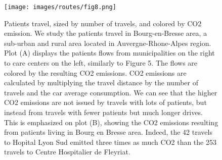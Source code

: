 \begin{figure}[t]
    \texttt{[image: images/routes/fig8.png]}
    \centering
    \caption{
        Patients travel, sized by number of travels, and colored by CO2 emission. We study the patients travel in Bourg-en-Bresse area, a sub-urban and rural area located in Auvergne-Rhone-Alpes region. Plot (A) displays the patients flows from municipalities on the right to care centers on the left, similarly to Figure 5. The flows are colored by the resulting CO2 emissions. CO2 emissions are calculated by multiplying the travel distance by the number of travels and the car average consumption. We can see that the higher CO2 emissions are not issued by travels with lots of patients, but instead from travels with fewer patients but much longer drives. This is emphasized on plot (B), showing the CO2 emissions resulting from patients living in Bourg en Bresse area. Indeed, the 42 travels to Hopital Lyon Sud emitted three times as much CO2 than the 253 travels to Centre Hospitalier de Fleyriat.
    }
    \label{fig:routes-co2-01}
\end{figure}
